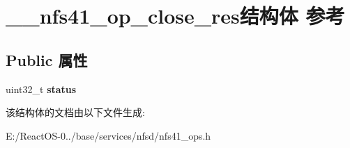 \hypertarget{struct____nfs41__op__close__res}{}\section{\+\_\+\+\_\+nfs41\+\_\+op\+\_\+close\+\_\+res结构体 参考}
\label{struct____nfs41__op__close__res}
\subsection*{Public 属性}
\begin{DoxyCompactItemize}
\item 
\mbox{\label{struct____nfs41__op__close__res_adccc983a4276447fc3daf1cf6f4807fb}} 
uint32\+\_\+t {\bfseries status}
\end{DoxyCompactItemize}


该结构体的文档由以下文件生成\+:\begin{DoxyCompactItemize}
\item 
E\+:/\+React\+O\+S-\/0../base/services/nfsd/nfs41\+\_\+ops.\+h\end{DoxyCompactItemize}
